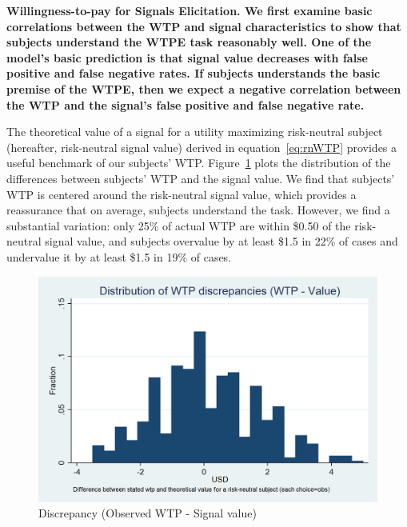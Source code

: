 \documentclass[12pt,a4paper]{article}
\begin{document}
\bf Willingness-to-pay for Signals Elicitation. \rm We first examine basic correlations between the WTP and signal characteristics to show that subjects understand the WTPE task reasonably well. One of the model's basic prediction is that signal value decreases with false positive and false negative rates. If subjects understands the basic premise of the WTPE, then we expect a negative correlation between the WTP and the signal's false positive and false negative rate. 


The theoretical value of a signal for a utility maximizing risk-neutral subject (hereafter, risk-neutral signal value) derived in equation~\ref{eq:rnWTP} provides a useful benchmark of our subjects' WTP. Figure~\ref{fig:WTPhist} plots the distribution of the differences between subjects' WTP and the signal value.  
We find that subjects' WTP is centered around the risk-neutral signal value, which provides a reassurance that on average, subjects understand the task. However, we find a substantial variation: only 25\% of actual WTP are within \$0.50 of the risk-neutral signal value, and subjects overvalue by at least \$1.5 in 22\% of cases and undervalue it  by at least \$1.5 in 19\% of cases. 

\begin{figure}[H]\centering 
	\includegraphics[scale=0.2]{Graphs/hist_WTP_discr1.png}

\caption{Discrepancy (Observed WTP - Signal value)}\label{fig:WTPhist}
\end{figure}
\end{document}
